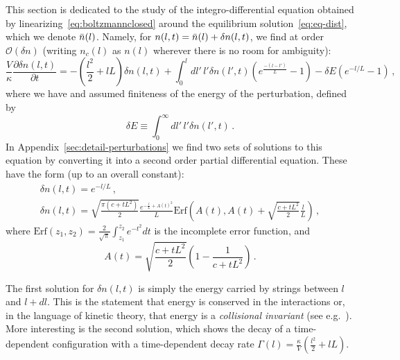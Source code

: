 \documentclass[a4paper,11pt]{article}
\newcommand{\lr}[1]{\left(#1\right)}
\begin{document}
This section is dedicated to the study of the integro-differential equation obtained by linearizing~\eqref{eq:boltzmannclosed} around the equilibrium solution~\eqref{eq:eq-dist}, which we denote $\Bar{n}(l)$.
Namely, for $n(l,t)=\Bar{n}(l)+\delta n(l,t)$, we find at order $\mathcal{O}(\delta n)$ (writing $n_c(l)$ as $n(l)$ wherever there is no room for ambiguity):
\begin{equation}\label{eq:diffeq-f}
    \frac{V}{\kappa}\frac{\partial{ \delta n(l,t)}}{\partial t}=-\lr{\frac{l^2}{2}+lL}\delta n(l,t)+\int_0^l{dl'\, l'\delta n(l',t)\lr{e^{\frac{-(l-l')}{L}}-1}}-\delta E\lr{e^{-l/L}-1}\, ,
\end{equation}
where we have and assumed finiteness of the energy of the perturbation, defined by
\begin{equation}
    \delta E\equiv \int_0^\infty {dl'\, l' \delta n(l',t)}\, .
\end{equation}
In Appendix~\ref{sec:detail-perturbations} we find two sets of solutions to this equation by converting it into a second order partial differential equation.
These have the form (up to an overall constant):
\begin{gather}
    \delta n(l,t)=e^{-l/L}\, ,\label{equildiff}\\
    \delta n(l,t)=\sqrt{\frac{\pi(c+t L^2)}{2}}\frac{e^{-\frac{l}{L}+A(t)^2}}{L}\text{Erf}\lr{A(t),A(t)+\sqrt{\frac{c+t L^2}{2}}\frac{l}{L}}\, ,\label{erfsoln}
\end{gather}
where $\text{Erf}(z_1,z_2)=\frac{2}{\sqrt{\pi}}\int_{z_1}^{z_2}{e^{-t^2}dt}$ is the incomplete error function, and
\begin{equation}
    A(t)=\sqrt{\frac{c+t L^2}{2}}\lr{1-\frac{1}{c+tL^2}}\, .
\end{equation}

The first solution for $\delta n(l,t)$ is simply the energy carried by strings between $l$ and $l+dl$.
This is the statement that energy is conserved in the interactions or, in the language of kinetic theory, that energy is a \textit{collisional invariant} (see e.g.~\cite{Tong:notes}). 
More interesting is the second solution, which shows the decay of a time-dependent configuration with a time-dependent decay rate $\Gamma (l)=\frac{\kappa}{V}\lr{\frac{l^2}{2}+l L}$.
\\
\end{document}
